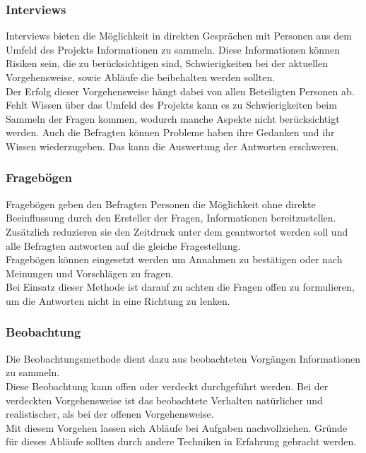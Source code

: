 \documentclass[12pt,a4paper]{article}
\begin{document}
\subsubsection{Interviews}
\label{interview}
Interviews bieten die Möglichkeit in direkten Gesprächen mit Personen aus dem Umfeld des Projekts Informationen zu sammeln. Diese Informationen können Risiken sein, die zu berücksichtigen sind, Schwierigkeiten bei der aktuellen Vorgehensweise, sowie Abläufe die beibehalten werden sollten. \\
Der Erfolg dieser Vorgehensweise hängt dabei von allen Beteiligten Personen ab. Fehlt Wissen über das Umfeld des Projekts kann es zu Schwierigkeiten beim Sammeln der Fragen kommen, wodurch manche Aspekte nicht berücksichtigt werden. Auch die Befragten können Probleme haben ihre Gedanken und ihr Wissen wiederzugeben\cite{tiwari2012selecting}. Das kann die Auswertung der Antworten erschweren.
\subsubsection{Fragebögen}
\label{Fragebögen}
Fragebögen geben den Befragten Personen die Möglichkeit ohne direkte Beeinflussung durch den Ersteller der Fragen, Informationen bereitzustellen. Zusätzlich reduzieren sie den Zeitdruck unter dem geantwortet werden soll und alle Befragten antworten auf die gleiche Fragestellung.\\
Fragebögen können eingesetzt werden um Annahmen zu bestätigen oder nach Meinungen und Vorschlägen zu fragen\cite{tiwari2012selecting}. \\
Bei Einsatz dieser Methode ist darauf zu achten die Fragen offen zu formulieren, um die Antworten nicht in eine Richtung zu lenken. 
\subsubsection{Beobachtung}
\label{Beobachtung}
Die Beobachtungsmethode dient dazu aus beobachteten Vorgängen Informationen zu sammeln. \\
Diese Beobachtung kann offen oder verdeckt durchgeführt werden. Bei der verdeckten Vorgehensweise ist das beobachtete Verhalten natürlicher und realistischer, als bei der offenen Vorgehensweise\cite{silhavy2011requirements}. \\
Mit diesem Vorgehen lassen sich Abläufe bei Aufgaben nachvollziehen. Gründe für dieses Abläufe sollten durch andere Techniken in Erfahrung gebracht werden.\\
\end{document}
